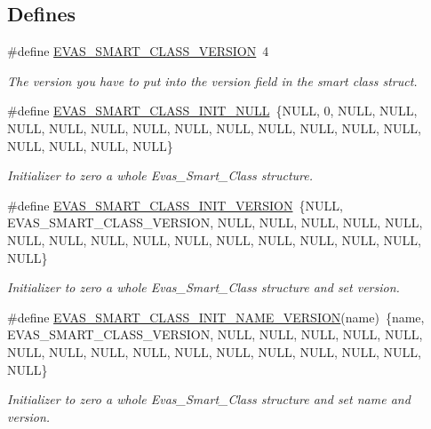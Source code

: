 \subsection*{Defines}
\begin{DoxyCompactItemize}
\item 
\#define \hyperlink{group__Evas__Smart__Group_ga1ca1514302a47188c921b232d6ce42db}{EVAS\_\-SMART\_\-CLASS\_\-VERSION}~4\label{group__Evas__Smart__Group_ga1ca1514302a47188c921b232d6ce42db}

\begin{DoxyCompactList}\small\item\em The version you have to put into the version field in the smart class struct. \item\end{DoxyCompactList}\item 
\#define \hyperlink{group__Evas__Smart__Group_ga223f5d420c1e22275cd6490cd77c85f0}{EVAS\_\-SMART\_\-CLASS\_\-INIT\_\-NULL}~\{NULL, 0, NULL, NULL, NULL, NULL, NULL, NULL, NULL, NULL, NULL, NULL, NULL, NULL, NULL, NULL, NULL, NULL\}
\begin{DoxyCompactList}\small\item\em Initializer to zero a whole Evas\_\-Smart\_\-Class structure. \item\end{DoxyCompactList}\item 
\#define \hyperlink{group__Evas__Smart__Group_gaaa610a135c79167162405b56cffe8562}{EVAS\_\-SMART\_\-CLASS\_\-INIT\_\-VERSION}~\{NULL, EVAS\_\-SMART\_\-CLASS\_\-VERSION, NULL, NULL, NULL, NULL, NULL, NULL, NULL, NULL, NULL, NULL, NULL, NULL, NULL, NULL, NULL, NULL\}
\begin{DoxyCompactList}\small\item\em Initializer to zero a whole Evas\_\-Smart\_\-Class structure and set version. \item\end{DoxyCompactList}\item 
\#define \hyperlink{group__Evas__Smart__Group_gaff2bbd5bb79e51ad8d31f98106caff77}{EVAS\_\-SMART\_\-CLASS\_\-INIT\_\-NAME\_\-VERSION}(name)~\{name, EVAS\_\-SMART\_\-CLASS\_\-VERSION, NULL, NULL, NULL, NULL, NULL, NULL, NULL, NULL, NULL, NULL, NULL, NULL, NULL, NULL, NULL, NULL\}
\begin{DoxyCompactList}\small\item\em Initializer to zero a whole Evas\_\-Smart\_\-Class structure and set name and version. \item\end{DoxyCompactList}\item 

\end{DoxyCompactItemize}
